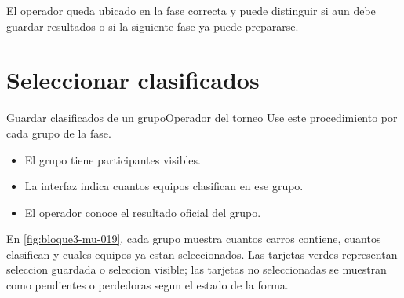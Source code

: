 \begin{resultadoesperado}
El operador queda ubicado en la fase correcta y puede distinguir si aun debe guardar resultados o si la siguiente fase ya puede prepararse.
\end{resultadoesperado}

\section{Seleccionar clasificados}


\begin{procedimiento}{Guardar clasificados de un grupo}{Operador del torneo}
Use este procedimiento por cada grupo de la fase.
\end{procedimiento}

\begin{precondiciones}
\begin{itemize}
    \item El grupo tiene participantes visibles.
    \item La interfaz indica cuantos equipos clasifican en ese grupo.
    \item El operador conoce el resultado oficial del grupo.
\end{itemize}
\end{precondiciones}


En \cref{fig:bloque3-mu-019}, cada grupo muestra cuantos carros contiene, cuantos clasifican y cuales equipos ya estan seleccionados. Las tarjetas verdes representan seleccion guardada o seleccion visible; las tarjetas no seleccionadas se muestran como pendientes o perdedoras segun el estado de la forma.

